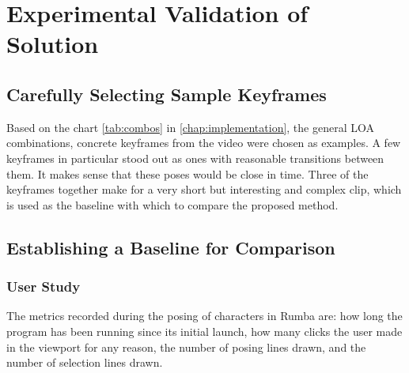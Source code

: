 \chapter{Experimental Validation of Solution}\label{chap:results}

\section{Carefully Selecting Sample Keyframes}
Based on the chart \autoref{tab:combos} in \autoref{chap:implementation}, the general LOA combinations, concrete keyframes from the video were chosen as examples. A few keyframes in particular stood out as ones with reasonable transitions between them. It makes sense that these poses would be close in time. Three of the keyframes together make for a very short but interesting and complex clip, which is used as the baseline with which to compare the proposed method.

\section{Establishing a Baseline for Comparison}
\subsection{User Study}


The metrics recorded during the posing of characters in Rumba are: how long the program has been running since its initial launch, how many clicks the user made in the viewport for any reason, the number of posing lines drawn, and the number of selection lines drawn.

